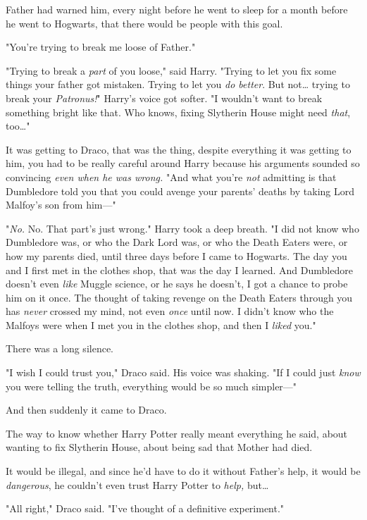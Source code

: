 Father had warned him, every night before he went to sleep for a month before 
he went to Hogwarts, that there would be people with this goal.

"You're trying to break me loose of Father."

"Trying to break a \emph{part} of you loose," said Harry. "Trying to let you 
fix some things your father got mistaken. Trying to let you \emph{do better}. 
But not{\ldots} trying to break your \emph{Patronus!}" Harry's voice got 
softer. "I wouldn't want to break something bright like that. Who knows, fixing 
Slytherin House might need \emph{that}, too{\ldots}"

It was getting to Draco, that was the thing, despite everything it was getting 
to him, you had to be really careful around Harry because his arguments sounded 
so convincing \emph{even when he was wrong.} "And what you're \emph{not} 
admitting is that Dumbledore told you that you could avenge your parents' 
deaths by taking Lord Malfoy's son from him---"

"\emph{No.} No. That part's just wrong." Harry took a deep breath. "I did not 
know who Dumbledore was, or who the Dark Lord was, or who the Death Eaters 
were, or how my parents died, until three days before I came to Hogwarts. The 
day you and I first met in the clothes shop, that was the day I learned. And 
Dumbledore doesn't even \emph{like} Muggle science, or he says he doesn't, I 
got a chance to probe him on it once. The thought of taking revenge on the 
Death Eaters through you has \emph{never} crossed my mind, not even \emph{once} 
until now. I didn't know who the Malfoys were when I met you in the clothes 
shop, and then I \emph{liked} you."

There was a long silence.

"I wish I could trust you," Draco said. His voice was shaking. "If I could just 
\emph{know} you were telling the truth, everything would be so much simpler---"

And then suddenly it came to Draco.

The way to know whether Harry Potter really meant everything he said, about 
wanting to fix Slytherin House, about being sad that Mother had died.

It would be illegal, and since he'd have to do it without Father's help, it 
would be \emph{dangerous}, he couldn't even trust Harry Potter to \emph{help,} 
but{\ldots}

"All right," Draco said. "I've thought of a definitive experiment."

